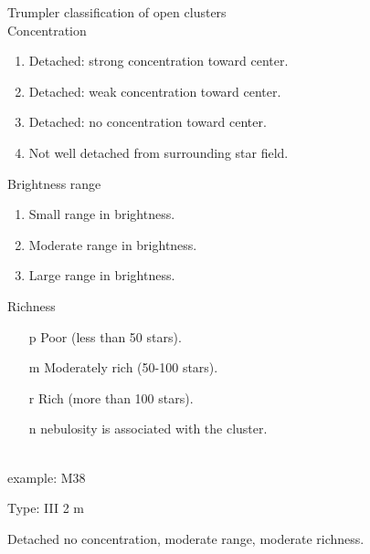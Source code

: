 Trumpler classification of open clusters
\ \\[2ex]

Concentration
\begin{enumerate}[I]
    \item Detached: strong concentration toward center.
    \item Detached: weak concentration toward center.
    \item Detached: no concentration toward center.
    \item Not well detached from surrounding star field.
\end{enumerate}

Brightness range
\begin{enumerate}
    \item Small range in brightness.
    \item Moderate range in brightness.
    \item Large range in brightness.
\end{enumerate}

Richness
\begin{itemize}
    \item[p] Poor (less than 50 stars).
    \item[m] Moderately rich (50-100 stars).
    \item[r] Rich (more than 100 stars).
    \item[n] nebulosity is associated with the cluster.
\end{itemize}
\ \\[2ex]

example: M38

Type: III 2 m

Detached no concentration, moderate range, moderate richness.
